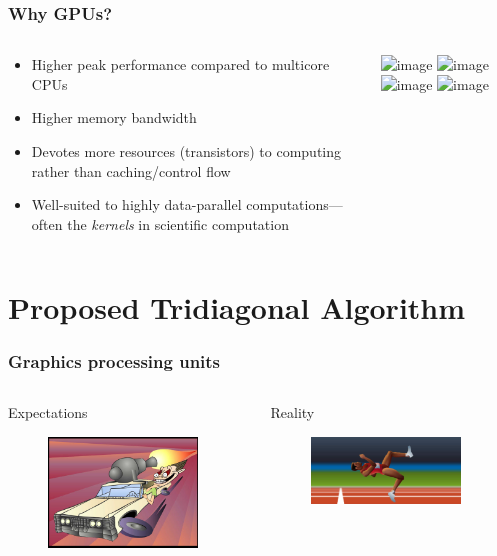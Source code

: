 \documentclass[8pt]{beamer}
\begin{document}
\begin{frame}[t]
\frametitle{Why GPUs?}
\pause
\footnotesize
\begin{columns}[T]
\begin{column}{0.4\textwidth}
\begin{itemize}
    \item<2-> Higher peak performance
        compared to multicore CPUs
    \item<3-> Higher memory bandwidth
    \item<4-> Devotes more resources
        (transistors) to computing
        rather than caching/control flow
    \item<5-> Well-suited to
        highly data-parallel computations---often the
        \emph{kernels} in scientific computation
\end{itemize}
\end{column}

\begin{column}{0.6\textwidth}
\includegraphics<2>[width=180px]
    {img/floating-point-operations-per-second.png}
\includegraphics<3>[width=180px]
    {img/memory-bandwidth.png}
\includegraphics<4>[width=180px]
    {img/device-comparison.png}
\includegraphics<5>[width=180px]
    {img/device-comparison.png}
\end{column}
\end{columns}
\end{frame}


\section{Proposed Tridiagonal Algorithm}
\begin{frame}
\frametitle{Graphics processing units}
\begin{columns}[c]
\begin{column}[T]{5cm}
    Expectations
    \begin{figure}
    \includegraphics[width=150px]{img/expectations.jpg}
    \end{figure}
\end{column}

\begin{column}[T]{5cm}
    Reality
    \begin{figure}
    \includegraphics[width=150px]{img/reality.png}
    \end{figure}
\end{column}
\end{columns}
\end{frame}
\end{document}
